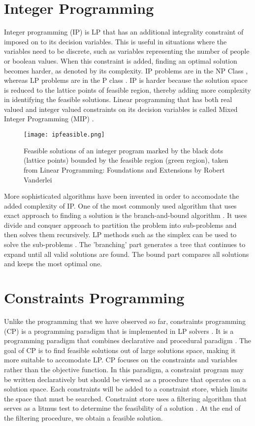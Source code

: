 \section{Integer Programming}
Integer programming (IP) \cite{LPVanderbei} is LP that has an additional
integrality constraint of imposed on to its decision variables. This is useful in situations where the variables need to be
discrete, such as variables representing the number of people or boolean values.
When this constraint is added, finding an optimal solution becomes harder, as denoted by its complexity.
IP problems are in the NP Class \cite{Papadimitriou1981}, whereas LP problems are in the P class \cite{Megiddo1987}.
 IP is harder because the solution space is reduced to
the lattice points of feasible region, thereby adding more complexity in identifying the feasible solutions.
Linear programming that has both real valued and integer valued constraints on its
 decision variables is called Mixed Integer Programming (MIP) \cite{LPVanderbei}.
\begin{figure}[!ht]
  \centering
    \texttt{[image: ipfeasible.png]}
    \caption{Feasible solutions of an integer program marked by the black dots (lattice points) bounded by the feasible region (green region), taken from
     Linear Programming: Foundations and Extensions by Robert Vanderlei \cite{Sottinen2009}}
\end{figure}

More sophisticated algorithms have been invented in order to accomodate the added complexity of IP. One of the most commonly
used algorithm that uses exact approach to finding a solution is the branch-and-bound algorithm  \cite{LPVanderbei, LPChvatal, Dastghaibifard2008}. It uses divide and
conquer approach to partition the problem into sub-problems
and then solves them recursively. LP methods such as the simplex can be used to solve the sub-problems \cite{Dastghaibifard2008}.
The 'branching' part generates a tree
that continues to expand until all valid solutions are found. The bound part compares all solutions and keeps the
most optimal one.

\section{Constraints Programming}
Unlike the programming that we have observed so far, constraints programming (CP) is a programming paradigm that is implemented
in LP solvers \cite{wiki:cp}. It is a programming paradigm that combines declarative and procedural paradigm \cite{wiki:cp, Bockmayr2003}.
The goal of CP is to find feasible solutions out of large solutions space, making it
more suitable to accomodate LP. CP focuses on the constraints and variables rather than the objective function.
In this paradigm, a constraint program may be written declaratively but should be viewed as a procedure that operates on a
solution space. Each constraints will be added to a constraint store, which limits the space that must be searched.
Constraint store uses a filtering algorithm that serves as a litmus test to determine the feasibility of a solution \cite{Bockmayr2003}.
At the end of the filtering procedure, we obtain a feasible solution.

